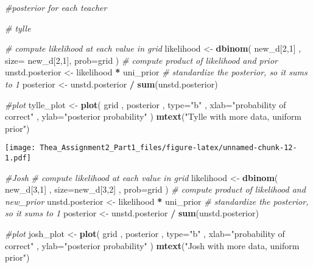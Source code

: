 \documentclass[]{article}
\newenvironment{Shaded}{\begin{snugshade}}{\end{snugshade}}
\newcommand{\KeywordTok}[1]{\textcolor[rgb]{0.13,0.29,0.53}{\textbf{#1}}}
\newcommand{\DataTypeTok}[1]{\textcolor[rgb]{0.13,0.29,0.53}{#1}}
\newcommand{\DecValTok}[1]{\textcolor[rgb]{0.00,0.00,0.81}{#1}}
\newcommand{\StringTok}[1]{\textcolor[rgb]{0.31,0.60,0.02}{#1}}
\newcommand{\CommentTok}[1]{\textcolor[rgb]{0.56,0.35,0.01}{\textit{#1}}}
\newcommand{\OperatorTok}[1]{\textcolor[rgb]{0.81,0.36,0.00}{\textbf{#1}}}
\newcommand{\NormalTok}[1]{#1}
\begin{document}
\begin{Shaded}
\begin{Highlighting}[]
\CommentTok{#posterior for each teacher}

\CommentTok{# tylle}

\CommentTok{# compute likelihood at each value in grid}
\NormalTok{likelihood <-}\StringTok{ }\KeywordTok{dbinom}\NormalTok{( new_d[}\DecValTok{2}\NormalTok{,}\DecValTok{1}\NormalTok{] , }\DataTypeTok{size=}\NormalTok{ new_d[}\DecValTok{2}\NormalTok{,}\DecValTok{1}\NormalTok{], }\DataTypeTok{prob=}\NormalTok{grid )}
\CommentTok{# compute product of likelihood and prior}
\NormalTok{unstd.posterior <-}\StringTok{ }\NormalTok{likelihood }\OperatorTok{*}\StringTok{ }\NormalTok{uni_prior}
\CommentTok{# standardize the posterior, so it sums to 1}
\NormalTok{posterior <-}\StringTok{ }\NormalTok{unstd.posterior }\OperatorTok{/}\StringTok{ }\KeywordTok{sum}\NormalTok{(unstd.posterior)}

\CommentTok{#plot}
\NormalTok{tylle_plot <-}\StringTok{ }\KeywordTok{plot}\NormalTok{( grid , posterior , }\DataTypeTok{type=}\StringTok{"b"}\NormalTok{ ,}
    \DataTypeTok{xlab=}\StringTok{"probability of correct"}\NormalTok{ , }\DataTypeTok{ylab=}\StringTok{"posterior probability"}\NormalTok{ )}
\KeywordTok{mtext}\NormalTok{(}\StringTok{"Tylle with more data, uniform prior"}\NormalTok{)}
\end{Highlighting}
\end{Shaded}

\texttt{[image: Thea\_Assignment2\_Part1\_files/figure-latex/unnamed-chunk-12-1.pdf]}

\begin{Shaded}
\begin{Highlighting}[]
\CommentTok{#Josh}
\CommentTok{# compute likelihood at each value in grid}
\NormalTok{likelihood <-}\StringTok{ }\KeywordTok{dbinom}\NormalTok{( new_d[}\DecValTok{3}\NormalTok{,}\DecValTok{1}\NormalTok{] , }\DataTypeTok{size=}\NormalTok{new_d[}\DecValTok{3}\NormalTok{,}\DecValTok{2}\NormalTok{] , }\DataTypeTok{prob=}\NormalTok{grid )}
\CommentTok{# compute product of likelihood and new_prior}
\NormalTok{unstd.posterior <-}\StringTok{ }\NormalTok{likelihood }\OperatorTok{*}\StringTok{ }\NormalTok{uni_prior}
\CommentTok{# standardize the posterior, so it sums to 1}
\NormalTok{posterior <-}\StringTok{ }\NormalTok{unstd.posterior }\OperatorTok{/}\StringTok{ }\KeywordTok{sum}\NormalTok{(unstd.posterior)}

\CommentTok{#plot}
\NormalTok{josh_plot <-}\StringTok{ }\KeywordTok{plot}\NormalTok{( grid , posterior , }\DataTypeTok{type=}\StringTok{"b"}\NormalTok{ ,}
    \DataTypeTok{xlab=}\StringTok{"probability of correct"}\NormalTok{ , }\DataTypeTok{ylab=}\StringTok{"posterior probability"}\NormalTok{ )}
\KeywordTok{mtext}\NormalTok{(}\StringTok{"Josh with more data, uniform prior"}\NormalTok{)}
\end{Highlighting}
\end{Shaded}
\end{document}
